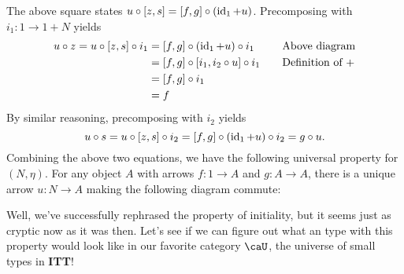 \documentclass[12pt,twoside,draft]{reedthesis}
\makeatletter
\let\oldindex\index
\renewcommand{\index}[1]{\oldindex{#1}\marginpar{\footnotesize\color{index}index: #1}}
\newcommand{\indeX}[1]{\oldindex{#1}}
\newcommand{\abbreviation}[1]{\textbf{#1}\indeX{#1@\textbf{#1}}} %
\makeatother
\begin{document}
\begin{example}
  The above square states $u\circ [z,s]= [f,g]\circ (\operatorname{id}_1+u)$. Precomposing
  with $i_1:1\to 1+N$ yields
  \begin{align*}
    u\circ z = u\circ [z,s]\circ i_1
    &= [f,g]\circ (\operatorname{id}_1+u) \circ i_1 
    &&\quad\text{Above diagram} \\
    &= [f,g]\circ [i_1,i_2\circ u] \circ i_1 
    &&\quad\text{Definition of }+ \\
    &= [f, g]\circ i_1 \\
    &= f
  \end{align*}
  By similar reasoning, precomposing with $i_2$ yields
  \begin{equation*}
    u\circ s = u\circ [z,s] \circ i_2
    = [f,g]\circ(\operatorname{id}_1+u)\circ i_2
    = g\circ u.
  \end{equation*}
  Combining the above two equations, we have the following universal property
  for $(N,\eta)$. For any object $A$ with arrows $f:1\to A$ and $g:A\to A$,
  there is a unique arrow $u:N\to A$ making the following diagram commute:
  \begin{center}
  \end{center}
  Well, we've successfully rephrased the property of initiality, but it seems
  just as cryptic now as it was then. Let's see if we can figure out what an
  type with this property would look like in our favorite category $\caU$, the
  universe of small types in \abbreviation{ITT}!


\end{example}
\end{document}
